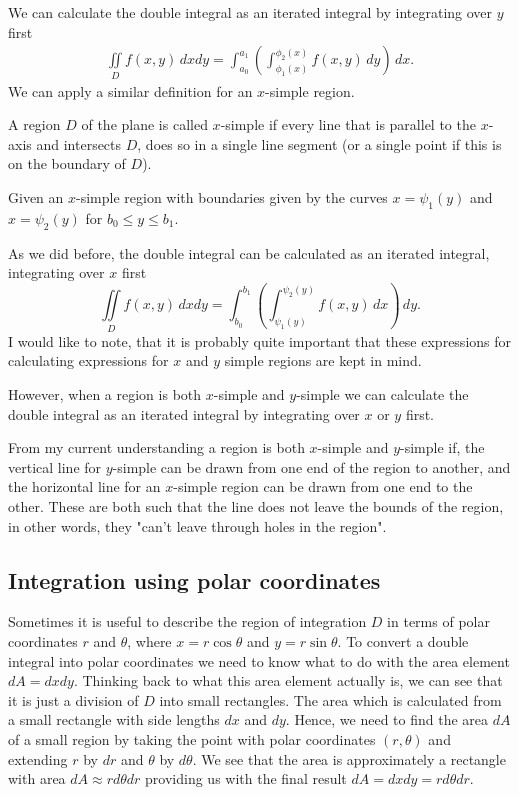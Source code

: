 \documentclass[10pt, a4paper]{article}
\begin{document}
We can calculate the double integral as an iterated integral by integrating over $y$ first
\begin{gather*}
    \iint\limits_{D} f(x, y)\,dxdy = \int_{a_0}^{a_1}\left(\int_{\phi_1(x)}^{\phi_2(x)}f(x, y)\,dy\right)\,dx.
\end{gather*}
We can apply a similar definition for an $x$-simple region.
\begin{definition}
    A region $D$ of the plane is called $x$-simple if every line that is parallel to the $x$-axis and intersects $D$,
    does so in a single line segment
    (or a single point if this is on the boundary of $D$).
\end{definition}
Given an $x$-simple region with boundaries given by the curves $x = \psi_1(y)$ and $x = \psi_2(y)$ for $b_0 \leq y \leq b_1$.

As we did before,
the double integral can be calculated as an iterated integral,
integrating over $x$ first
\[
\iint\limits_Df(x, y)\,dxdy = \int_{b_0}^{b_1}\left(\int_{\psi_1(y)}^{\psi_2(y)}f(x, y)\,dx\right)\,dy.
\]
I would like to note,
that it is probably quite important that these expressions for calculating expressions for $x$ and $y$ simple regions are kept in mind.

However,
when a region is both $x$-simple and $y$-simple we can calculate the double integral as an iterated integral by integrating over $x$ or $y$ first.

From my current understanding a region is both $x$-simple and $y$-simple if,
the vertical line for $y$-simple can be drawn from one end of the region to another,
and the horizontal line for an $x$-simple region can be drawn from one end to the other.
These are both such that the line does not leave the bounds of the region,
in other words, they "can't leave through holes in the region".

\subsection{Integration using polar coordinates}
Sometimes it is useful to describe the region of integration $D$ in terms of polar coordinates $r$ and $\theta$,
where $x = r\cos\theta$ and $y = r\sin\theta$.
To convert a double integral into polar coordinates we need to know what to do with the area element $dA = dxdy$.
Thinking back to what this area element actually is,
we can see that it is just a division of $D$ into small rectangles.
The area which is calculated from a small rectangle with side lengths $dx$ and $dy$.
Hence,
we need to find the area $dA$ of a small region by taking the point with polar coordinates $(r, \theta)$
and extending $r$ by $dr$ and $\theta$ by $d\theta$.
We see that the area is approximately a rectangle with area $dA \approx rd\theta dr$
providing us with the final result $dA = dxdy = rd\theta dr$.
\end{document}

